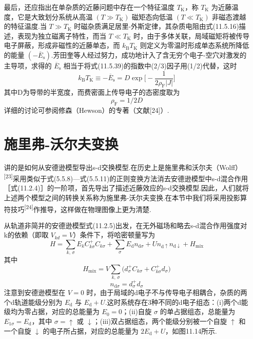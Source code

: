 最后，还应指出在单杂质的近藤问题中存在一个特征温度 $T_{\mathrm{K}}$，称 $T_{\mathrm{K}}$ 为近藤温度，它是大致划分系统从高温 $(T\gg T_{\mathrm{K}})$ 磁矩态向低温 $(T\ll T_{\mathrm{K}})$ 非磁态渡越的特征温度.当 $T\gg T_{\mathrm{K}}$ 时磁杂质满足居里-外斯定律，其杂质电阻由式(11.5.16)描述，表现为独立磁离子特性，而当 $T\ll T_{\mathrm{K}}$ 时，由于多体关联，局域磁矩将被传导电子屏蔽，形成非磁性的近藤单态，而 $k_{\mathrm{B}}T_{\mathrm{K}}$ 则定义为零温时形成单态系统所降低的能量 $(-\overline{E}_{\mathrm{s}})$.芳田奎等人经过努力，成功地计入了含无穷个电子-空穴对激发的主导项，求得的 $\overline{E}_{\mathrm{s}}$ 相当于将式(11.5.39)的指数中(2/3)因子用(1/2)代替，这时
\begin{equation}
  k_{\mathrm{B}}T_{\mathrm{K}}\equiv-\overline{E}_{\mathrm{s}}
  =D\exp\biggl[-\frac{1}{2\rho_{\mathrm{F}}|J|}\biggr]
\end{equation}
其中D为导带的半宽度，而费密面上传导电子的态密度取为
\begin{equation}
  \rho_{\mathrm{F}}=1/2D
\end{equation}
详细的讨论可参阅修森（Hewson）的专著（文献[24]）.

\section{施里弗-沃尔夫变换}

讲的是如何从安德逊模型导出s-d交换模型.在历史上是施里弗和沃尔夫（Wolff）\textsuperscript{[23]}采用类似于式(5.5.8)—式(5.5.11)的正则变换方法消去安德逊模型中s-d混合作用［式(11.2.4)］的一阶项，首先导出了描述近藤效应的s-d交换模型.因此，人们就将上述两个模型之间的转换关系称为施里弗-沃尔夫变换.在本节中我们将采用投影算符技巧\textsuperscript{[24]}作推导，这样做在物理图像上更为清楚.

从轨道非简并的安德逊模型式(11.2.5)出发，在无外磁场和略去s-d混合作用强度对k的依赖（即取 $V_{kd}=V$）条件下，将哈密顿量写为
\begin{equation}
  H=\sum_{k,\,\sigma}E_{k}C^{+}_{k\sigma}C_{k\sigma}
  +\sum_{\sigma}E_{\mathrm{d}}n_{\mathrm{d}\sigma}
  +Un_{\mathrm{d}\uparrow}n_{\mathrm{d}\downarrow}
  +H_{\mathrm{mix}}
\end{equation}
其中
\begin{equation}
  H_{\mathrm{mix}}=V\sum_{k,\,\sigma}
  \bigl(d^{+}_{\sigma}C_{k\sigma}+C^{+}_{k\sigma}d_{\sigma}\bigr)
\end{equation}
\begin{equation}
  n_{\mathrm{d}\sigma}=d^{+}_{\sigma}d_{\sigma}
\end{equation}
注意到安德逊模型在 $V=0$ 时，由于局域的d电子不与传导电子相耦合，杂质的两个d轨道能级分别为 $E_{\mathrm{d}}$ 与 $E_{\mathrm{d}}+U$.这时系统存在3种不同的d电子组态：(i)两个d能级均为零占据，对应的总能量为 $E_{0}=0$；(ii)自旋 $\sigma$ 的单占据组态，总能量为 $E_{1\sigma}=E_{\mathrm{d}}$，其中 $\sigma=\uparrow$ 或 $\downarrow$；(iii)双占据组态，两个能级分别被一个自旋 $\uparrow$ 和一个自旋 $\downarrow$ 的电子所占据，对应的总能量为 $2E_{\mathrm{d}}+U$，如图11.14所示.

